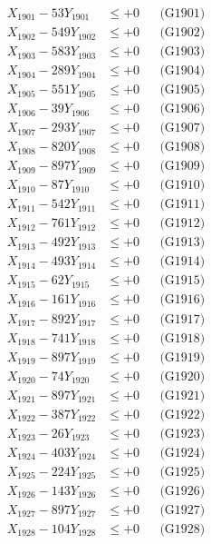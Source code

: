 \documentclass[a4paper,10pt]{article}
\begin{document}
{\begin{align}
\allowbreak
X_{1901} - 53Y_{1901} &\leq +0 && \text{(G1901)} \\
X_{1902} - 549Y_{1902} &\leq +0 && \text{(G1902)} \\
X_{1903} - 583Y_{1903} &\leq +0 && \text{(G1903)} \\
X_{1904} - 289Y_{1904} &\leq +0 && \text{(G1904)} \\
X_{1905} - 551Y_{1905} &\leq +0 && \text{(G1905)} \\
X_{1906} - 39Y_{1906} &\leq +0 && \text{(G1906)} \\
X_{1907} - 293Y_{1907} &\leq +0 && \text{(G1907)} \\
X_{1908} - 820Y_{1908} &\leq +0 && \text{(G1908)} \\
X_{1909} - 897Y_{1909} &\leq +0 && \text{(G1909)} \\
X_{1910} - 87Y_{1910} &\leq +0 && \text{(G1910)} \\
\allowbreak
X_{1911} - 542Y_{1911} &\leq +0 && \text{(G1911)} \\
X_{1912} - 761Y_{1912} &\leq +0 && \text{(G1912)} \\
X_{1913} - 492Y_{1913} &\leq +0 && \text{(G1913)} \\
X_{1914} - 493Y_{1914} &\leq +0 && \text{(G1914)} \\
X_{1915} - 62Y_{1915} &\leq +0 && \text{(G1915)} \\
X_{1916} - 161Y_{1916} &\leq +0 && \text{(G1916)} \\
X_{1917} - 892Y_{1917} &\leq +0 && \text{(G1917)} \\
X_{1918} - 741Y_{1918} &\leq +0 && \text{(G1918)} \\
X_{1919} - 897Y_{1919} &\leq +0 && \text{(G1919)} \\
X_{1920} - 74Y_{1920} &\leq +0 && \text{(G1920)} \\
\allowbreak
X_{1921} - 897Y_{1921} &\leq +0 && \text{(G1921)} \\
X_{1922} - 387Y_{1922} &\leq +0 && \text{(G1922)} \\
X_{1923} - 26Y_{1923} &\leq +0 && \text{(G1923)} \\
X_{1924} - 403Y_{1924} &\leq +0 && \text{(G1924)} \\
X_{1925} - 224Y_{1925} &\leq +0 && \text{(G1925)} \\
X_{1926} - 143Y_{1926} &\leq +0 && \text{(G1926)} \\
X_{1927} - 897Y_{1927} &\leq +0 && \text{(G1927)} \\
X_{1928} - 104Y_{1928} &\leq +0 && \text{(G1928)} \\

\end{align}}
\end{document}
